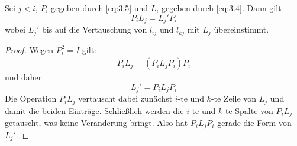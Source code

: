 \documentclass{mycourse}
\begin{document}
\setcounter{thm}{6}
\begin{lem}
\label{lem:3.7}
Sei $j<i$, $P_i$ gegeben durch \eqref{eq:3.5} und $L_i$ gegeben durch \eqref{eq:3.4}.
Dann gilt
\[
P_iL_j = L_j'P_i
\]
wobei $L_j'$ bis auf die Vertauschung von $l_{ij}$ und $l_{kj}$ mit $L_j$ übereinstimmt.

\begin{proof}
Wegen $P_i^2=I$ gilt:
\begin{align*}
P_iL_j = (P_iL_jP_i)P_i
\end{align*}
und daher
\[
L_j' = P_iL_jP_i
\]
Die Operation $P_iL_j$ vertauscht dabei zunächst $i$-te und $k$-te Zeile von $L_j$ und damit die beiden Einträge.
Schließlich werden die $i$-te und $k$-te Spalte von $P_iL_j$ getauscht, was keine Veränderung bringt.
Also hat $P_iL_jP_i$ gerade die Form von $L_j'$.
\end{proof}
\end{lem}
\end{document}
